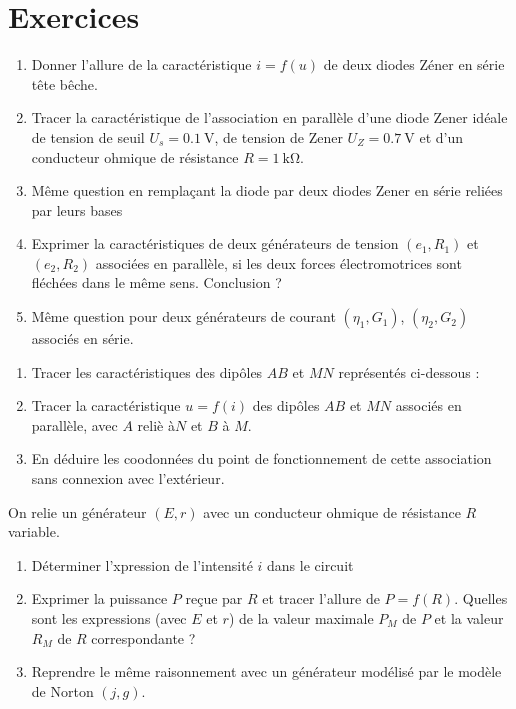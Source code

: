 \section{Exercices}
\begin{exercice}
	\begin{enumerate}
		\item Donner l'allure de la caractéristique $i=f(u)$ de deux diodes Zéner en série tête bêche.
		\item Tracer la caractéristique de l'association en parallèle d'une diode Zener idéale de tension de seuil $U_s=\SI{0.1}{\volt}$, de tension de Zener $U_Z = \SI{0.7}{\volt}$ et d'un conducteur ohmique de résistance $R=\SI{1}{\kilo\ohm}$.
		\item Même question en remplaçant la diode par deux diodes Zener en série reliées par leurs bases
		\item Exprimer la caractéristiques de deux générateurs de tension $(e_1, R_1)$ et $(e_2, R_2)$ associées en parallèle, si les deux forces électromotrices sont fléchées dans le même sens. Conclusion ?
		\item Même question pour deux générateurs de courant $(\eta_1, G_1)$, $(\eta_2, G_2)$ associés en série.
	\end{enumerate}
\end{exercice}
\begin{exercice}
	\begin{enumerate}
		\item Tracer les caractéristiques des dipôles $AB$ et $MN$ représentés ci-dessous :
		\item Tracer la caractéristique $u=f(i)$ des dipôles $AB$ et $MN$ associés en parallèle, avec $A$ reliè à$N$ et $B$ à $M$.
		\item En déduire les coodonnées du point de fonctionnement de cette association sans connexion avec l'extérieur.
	\end{enumerate}
\end{exercice}

\begin{exercice}
	On relie un générateur $(E, r)$ avec un conducteur ohmique de résistance $R$ variable.
	\begin{enumerate}
		\item Déterminer l'xpression de l'intensité $i$ dans le circuit
		\item Exprimer la puissance $P$ reçue par $R$ et tracer l'allure de $P=f(R)$. Quelles sont les expressions (avec $E$ et $r$) de la valeur maximale $P_M$ de $P$ et la valeur $R_M$ de $R$ correspondante ?
		\item Reprendre le même raisonnement avec un générateur modélisé par le modèle de Norton $(j, g)$.
	\end{enumerate}
\end{exercice}


